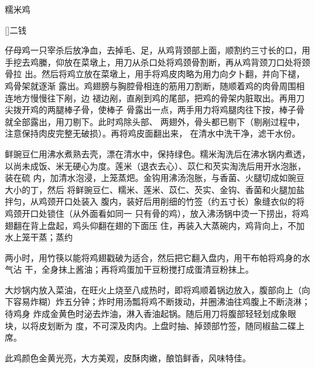 \begin{recipe}[八宝糯米鸡]{糯米鸡}

\ingredients

[\footnotemark]{二钱}

\preparation

\step 仔母鸡一只宰杀后放净血，去掉毛、足，从鸡背颈部上面，顺割约三寸长的口，用
手挖去鸡縢，仰放在菜墩上，用刀从杀口处将鸡颈骨割断，再从鸡背颈刀口处将颈骨拉
出。然后将鸡立放在菜墩上，用手将鸡皮肉略为用力向夕卜翻，并向下褪，鸡骨架就逐渐
露出。鸡翅膀与胸腔骨相连的筋用刀割断，随顺着鸡的肉骨周围相连地方慢慢往下剐，边
褪边剐，直剐到鸡的尾部，把鸡的骨架内脏取出。再用刀尖拨开鸡的两腿棒子骨，使棒子
骨露出一点，两手用力将鸡腿肉往下按，棒子骨就全部露出，用刀剔下。此时鸡除头部、
两翅外，骨头都已剔下（剔剐过程中，注意保持肉皮完整无破损）。再将鸡皮面翻出来，
在清水中洗干净，滤干水份。

\step 鲜豌豆仁用沸水煮熟去壳，漂在清水中，保持绿色。糯米淘洗后在沸水锅内煮透，
以尚未成饭、米无硬心为度。莲米（退衣去心）、苡仁和芡实淘洗后用开水泡胀，装在硫
内，加清水泡浸，上笼蒸𤆵。金钩用沸汤泡胀，与香菌、火腿切成如豌豆大小的丁，然后
将鲜豌豆仁、糯米、莲米、苡仁、芡实、金钩、香菌和火腿加盐拌匀，从鸡颈开口处装入
腹内，装好后用削细的竹签（约五寸长）象缝衣似的将鸡颈开口处锁住（从外面看如同一
只有骨的鸡），放入沸汤锅中烫一下捞出，将鸡翅翻在背上盘起，鸡头仰翻在翅的下面压
住，再装入大蒸碗内，鸡背向上，不加水上笼干蒸；蒸约

两小时，用竹筷以能将鸡翅戳破为适合，然后把它翻入盘内，用干布帕将鸡身的水气沾
干，全身抹上酱油；再将鸡蛋加干豆粉搅打成蛋清豆粉抹上。

\step 大炒锅内放入菜油，在旺火上烧至八成热时，即将鸡顺着锅边放入，腹部向上（向
下容易炸糊）炸五分钟；炸时用汤瓢将鸡不断拨动，并圈沸油往鸡腹上不断浇淋；待鸡身
炸成金黄色时泌去炸油，淋入香油起锅。随后用刀将腹部轻轻划成象眼块，以将皮划断为
度，不可深及肉内。上盘时抽、掉颈部竹签，随同椒盐二碟上席。

\features

此鸡颜色金黄光亮，大方美观，皮酥肉嫩，酿馅鲜香，风味特佳。


\end{recipe}

